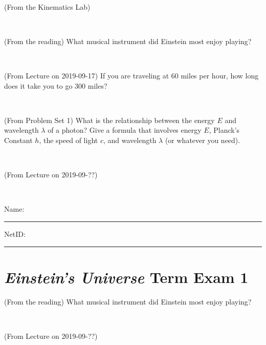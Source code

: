 \documentclass[12pt, letterpaper]{article}
\begin{document}
\vfill ~

\begin{problem} (From the Kinematics Lab)

\end{problem}


\vfill ~


\clearpage


\begin{problem} (From the reading)
What musical instrument did Einstein most enjoy playing?
\end{problem}


\vfill ~

\begin{problem} (From Lecture on 2019-09-17)
If you are traveling at 60 miles per hour, how long does
it take you to go 300 miles?
\end{problem}


\vfill ~

\begin{problem} (From Problem Set 1)
What is the relationship between the energy $E$ and wavelength
$\lambda$ of a photon? Give a formula that involves energy $E$,
Planck's Constant $h$, the speed of light $c$, and wavelength
$\lambda$ (or whatever you need).
\end{problem}

\vfill ~

\begin{problem} (From Lecture on 2019-09-??)
\end{problem}


\vfill ~


\cleardoublepage



\noindent
Name: \rule[-1ex]{0.60\textwidth}{0.1pt}
NetID: \rule[-1ex]{0.20\textwidth}{0.1pt}

\section*{\textsl{Einstein's Universe} Term Exam 1}
\setcounter{problem}{1}


\begin{problem} (From the reading)
What musical instrument did Einstein most enjoy playing?
\end{problem}


\vfill ~

\begin{problem} (From Lecture on 2019-09-??)
\end{problem}
\end{document}
